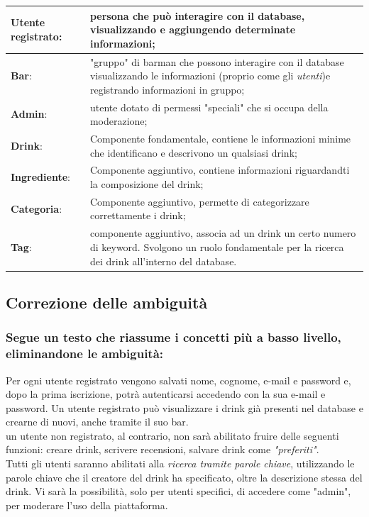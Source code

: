 \documentclass[a4paper,12pt]{report}
\begin{document}
\begin{tabular}{|l|p{8cm}|}
\hline
\textbf{Utente registrato}\normalsize: &persona che può interagire con il database, visualizzando e aggiungendo determinate informazioni;\\
\hline
\textbf{Bar}: &"gruppo" di barman che possono interagire con il database visualizzando le informazioni \footnotesize(proprio come gli \textit{utenti})\normalsize e registrando informazioni in gruppo;\\
\hline
\textbf{Admin}: &utente dotato di permessi "speciali" che si occupa della moderazione;\\
\hline
\textbf{Drink}: &Componente fondamentale, contiene le informazioni minime che identificano e descrivono un qualsiasi drink;\\
\hline
\textbf{Ingrediente}: &Componente aggiuntivo, contiene informazioni riguardandti la composizione del drink;\\
\hline
\textbf{Categoria}: &Componente aggiuntivo, permette di categorizzare correttamente i drink;\\
\hline
\textbf{Tag}: &componente aggiuntivo, associa ad un drink un certo numero di keyword. Svolgono un ruolo fondamentale per la ricerca dei drink all'interno del database.\\
\hline
\end{tabular}

\subsection{Correzione delle ambiguità}
\subsubsection{Segue un testo che riassume i concetti più a basso livello, eliminandone le ambiguità:}

Per ogni utente registrato vengono salvati nome, cognome, e-mail e password e, dopo la prima iscrizione, potrà autenticarsi accedendo con la sua e-mail e password. Un utente registrato può visualizzare i drink già presenti nel database e crearne di nuovi, anche tramite il suo bar.\\
un utente non registrato, al contrario, non sarà abilitato fruire delle seguenti funzioni: creare drink, scrivere recensioni, salvare drink come \textit{"preferiti"}.\\
Tutti gli utenti saranno abilitati alla \textit{ricerca tramite parole chiave}, utilizzando le parole chiave che il creatore del drink ha specificato, oltre la descrizione stessa del drink. 
Vi sarà la possibilità, solo per utenti specifici, di accedere come "admin", per moderare l'uso della piattaforma. 
\end{document}
